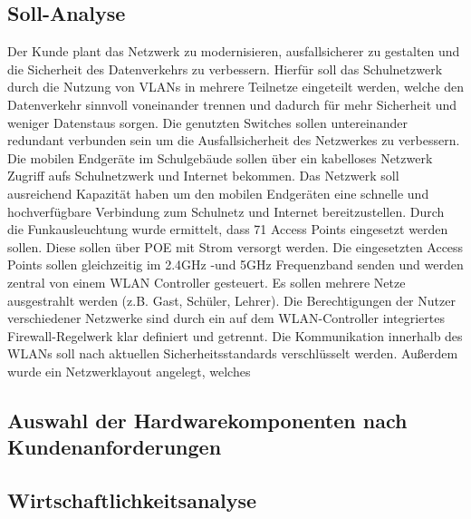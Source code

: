 \subsection{Soll-Analyse}
\label{sec:Soll-Analyse}
Der Kunde plant das Netzwerk zu modernisieren, ausfallsicherer zu gestalten und die Sicherheit des Datenverkehrs zu verbessern. Hierfür soll das Schulnetzwerk durch die Nutzung von \acs{VLAN}s in mehrere Teilnetze eingeteilt werden, welche den Datenverkehr sinnvoll voneinander trennen und dadurch für mehr Sicherheit und weniger Datenstaus sorgen. Die genutzten Switches sollen untereinander redundant verbunden sein um die Ausfallsicherheit des Netzwerkes zu verbessern. Die mobilen Endgeräte im Schulgebäude sollen über ein kabelloses Netzwerk Zugriff aufs Schulnetzwerk und Internet bekommen. Das Netzwerk soll ausreichend Kapazität haben um den mobilen Endgeräten eine schnelle und hochverfügbare Verbindung zum Schulnetz und Internet bereitzustellen. Durch die Funkausleuchtung wurde ermittelt, dass 71 Access Points eingesetzt werden sollen. Diese sollen über \ac{POE} mit Strom versorgt werden.
Die eingesetzten Access Points sollen gleichzeitig im 2.4GHz -und 5GHz Frequenzband senden und werden zentral von einem WLAN Controller gesteuert.
Es sollen mehrere Netze ausgestrahlt werden (z.B. Gast, Schüler, Lehrer). 
Die Berechtigungen der Nutzer verschiedener Netzwerke sind durch ein auf dem WLAN-Controller integriertes Firewall-Regelwerk klar definiert und getrennt. 
Die Kommunikation innerhalb des WLANs soll nach aktuellen Sicherheitsstandards verschlüsselt werden. Außerdem wurde ein Netzwerklayout angelegt, welches 

\begin{comment}
	\item Wie ist die bisherige Situation (\zB bestehende Programme, Wünsche der Mitarbeiter)?
	\item Was gilt es zu erstellen/verbessern?
\end{comment}
\subsection{Auswahl der Hardwarekomponenten nach Kundenanforderungen}
\label{app:Auswahl der Hardwarekomponenten nach Kundenanforderungen}


\subsection{Wirtschaftlichkeitsanalyse}
\label{sec:Wirtschaftlichkeitsanalyse}

